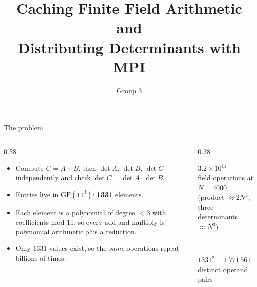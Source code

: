\documentclass[aspectratio=169,11pt]{beamer}
\title{Caching Finite Field Arithmetic and\\Distributing Determinants with MPI}
\author{Group 3}
\institute{CSE 625 Parallel Programming\\University of Louisville}
\date{}
\newcommand{\stat}[2]{%
  \begin{minipage}[t]{\linewidth}\centering
    {\Huge\bfseries\color{accent}#1}\\[0.3em]
    {\small\color{muted}#2}
  \end{minipage}}
\begin{document}
\begin{frame}[plain]
  \titlepage
\end{frame}

\begin{frame}{The problem}
  \begin{columns}[T]
    \begin{column}{0.58\textwidth}
      \begin{itemize}
        \item Compute $C = A \times B$, then $\det A$, $\det B$, $\det C$ independently
              and check $\det C = \det A \cdot \det B$.
        \item Entries live in $\mathrm{GF}(11^3)$: \textbf{1331} elements.
        \item Each element is a polynomial of degree $< 3$ with coefficients mod 11,
              so every add and multiply is polynomial arithmetic plus a reduction.
        \item Only 1331 values exist, so the \emph{same} operations repeat
              billions of times.
      \end{itemize}
    \end{column}
    \begin{column}{0.38\textwidth}
      \vspace{0.5em}
      \stat{$3.2\times10^{11}$}{field operations at $N=4000$\\(product $\approx 2N^3$, three determinants $\approx N^3$)}
      \\[1.5em]
      \stat{$1331^2 = 1\,771\,561$}{distinct operand pairs}
    \end{column}
  \end{columns}
\end{frame}
\end{document}

